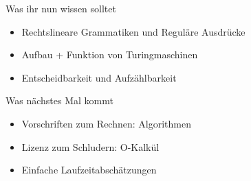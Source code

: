 
%

\begin{frame}	
	\begin{block}{Was ihr nun wissen solltet}
		\begin{itemize}
			\item Rechtslineare Grammatiken und Reguläre Ausdrücke
			\item Aufbau + Funktion von Turingmaschinen
			\item Entscheidbarkeit und Aufzählbarkeit
		\end{itemize}
	\end{block}
	
	\begin{block}{Was nächstes Mal kommt}
		\begin{itemize}
			\item Vorschriften zum Rechnen: Algorithmen
			\item Lizenz zum Schludern: O-Kalkül
			\item Einfache Laufzeitabschätzungen
		\end{itemize}
	\end{block}
\end{frame}

\slideThanks

